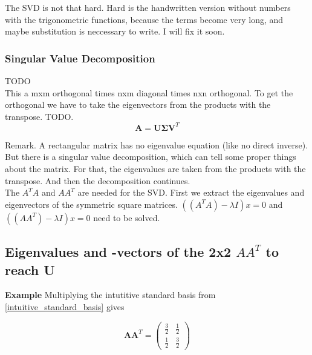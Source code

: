 \documentclass[a4paper]{article}
\begin{document}
\begin{PropositionOpt4}
The SVD is not that hard. Hard is the handwritten version without numbers with the trigonometric functions, because the terms become very long, and maybe substitution is neccessary to write. I will fix it soon.\\



\subsubsection{Singular Value Decomposition}

TODO\\

This a mxm orthogonal times nxm diagonal times nxn orthogonal. To get the orthogonal we have to take the eigenvectors from the products with the transpose. TODO.\\

\begin{displaymath}
    \boldsymbol{A} = \boldsymbol{U}\boldsymbol{\Sigma}\boldsymbol{V}^{T}
\end{displaymath}

Remark. A rectangular matrix has no eigenvalue equation (like no direct inverse). But there is a singular value decomposition, which can tell some proper things about the matrix. For that, the eigenvalues are taken from the products with the transpose. And then the decomposition continues.\\

The $A^{T}A$ and $AA^{T}$ are needed for the SVD. First we extract the eigenvalues and eigenvectors of the symmetric square matrices.
$((A^{T}A)-\lambda{I})x=0$ and $((AA^{T})-\lambda{I})x=0$ need to be solved.\\

\subsection{Eigenvalues and -vectors of the 2x2 $AA^{T}$ to reach U}
\label{eig_2x3}

\textbf{Example}
Multiplying the intutitive standard basis from \ref{intuitive_standard_basis} gives

\begin{displaymath}
\boldsymbol{A}\boldsymbol{A}^{T} = \begin{pmatrix}\frac32&\frac12\\\frac12&\frac32\end{pmatrix}
\end{displaymath}


\end{PropositionOpt4}
\end{document}
